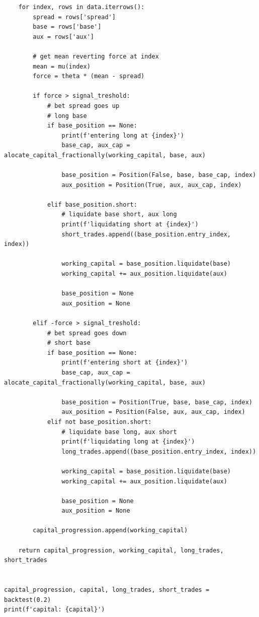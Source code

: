 \documentclass{article}
\begin{document}
\begin{spacing}{2.0}
\begin{lstlisting}
    for index, rows in data.iterrows():
        spread = rows['spread']
        base = rows['base']
        aux = rows['aux']

        # get mean reverting force at index
        mean = mu(index)
        force = theta * (mean - spread)

        if force > signal_treshold:
            # bet spread goes up
            # long base
            if base_position == None:
                print(f'entering long at {index}')
                base_cap, aux_cap = alocate_capital_fractionally(working_capital, base, aux)

                base_position = Position(False, base, base_cap, index)
                aux_position = Position(True, aux, aux_cap, index)

            elif base_position.short:
                # liquidate base short, aux long
                print(f'liquidating short at {index}')
                short_trades.append((base_position.entry_index, index))

                working_capital = base_position.liquidate(base)
                working_capital += aux_position.liquidate(aux)

                base_position = None
                aux_position = None

        elif -force > signal_treshold:
            # bet spread goes down
            # short base
            if base_position == None:
                print(f'entering short at {index}')
                base_cap, aux_cap = alocate_capital_fractionally(working_capital, base, aux)

                base_position = Position(True, base, base_cap, index)
                aux_position = Position(False, aux, aux_cap, index)
            elif not base_position.short:
                # liquidate base long, aux short
                print(f'liquidating long at {index}')
                long_trades.append((base_position.entry_index, index))

                working_capital = base_position.liquidate(base)
                working_capital += aux_position.liquidate(aux)

                base_position = None
                aux_position = None

        capital_progression.append(working_capital)

    return capital_progression, working_capital, long_trades, short_trades


capital_progression, capital, long_trades, short_trades = backtest(0.2)
print(f'capital: {capital}')


\end{lstlisting}
\end{spacing}
\end{document}
